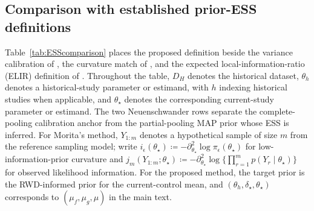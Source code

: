 \documentclass[11pt]{article}
\theoremstyle{remark}\newtheorem{remark}{Remark}[section]
\begin{document}
\subsection{Comparison with established prior-ESS definitions}\label{sec:B.1}
Table~\ref{tab:ESScomparison} places the proposed definition beside the variance calibration of \citet{Neuenschwander2010MAP}, the curvature match of \citet{Morita2008ESS}, and the expected local-information-ratio (ELIR) definition of \citet{neuenschwander2020}. Throughout the table, $D_H$ denotes the historical dataset, $\theta_h$ denotes a historical-study parameter or estimand, with $h$ indexing historical studies when applicable, and $\theta_\star$ denotes the corresponding current-study parameter or estimand. The two Neuenschwander rows separate the complete-pooling calibration anchor from the partial-pooling MAP prior whose ESS is inferred. For Morita's method, $Y_{1:m}$ denotes a hypothetical sample of size $m$ from the reference sampling model; write $i_\epsilon(\theta_\star)\coloneqq-\partial_{\theta_\star}^2\log\pi_\epsilon(\theta_\star)$ for low-information-prior curvature and $j_m(Y_{1:m};\theta_\star)\coloneqq-\partial_{\theta_\star}^2\log\{\prod_{r=1}^m p(Y_r\mid\theta_\star)\}$ for observed likelihood information. For the proposed method, the target prior is the RWD-informed prior for the current-control mean, and $(\theta_h,\delta_\star,\theta_\star)$ corresponds to $(\mu_f,\mu_g,\mu)$ in the main text.
\end{document}
